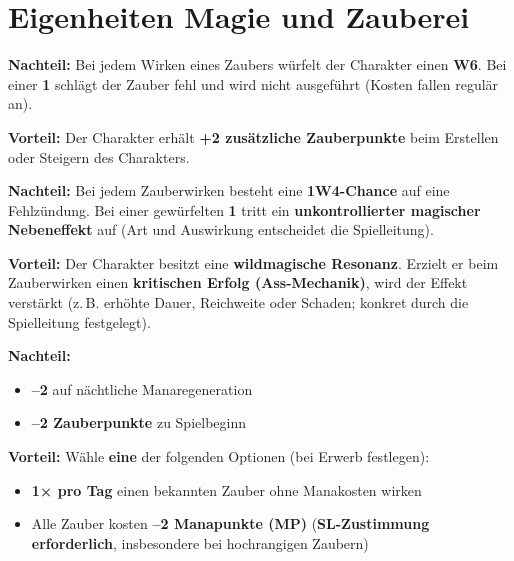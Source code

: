 \section{Eigenheiten Magie und Zauberei}

\begin{traitbox}{}
	
	\textbf{Nachteil:}  
	Bei jedem Wirken eines Zaubers würfelt der Charakter einen \textbf{W6}.
	Bei einer \textbf{1} schlägt der Zauber fehl und wird nicht ausgeführt
	(Kosten fallen regulär an).
	
	\medskip
	\textbf{Vorteil:}  
	Der Charakter erhält \textbf{+2 zusätzliche Zauberpunkte}
	beim Erstellen oder Steigern des Charakters.
	
\end{traitbox}

\begin{traitbox}{}
	
	\textbf{Nachteil:}  
	Bei jedem Zauberwirken besteht eine \textbf{1W4-Chance} auf eine Fehlzündung.
	Bei einer gewürfelten \textbf{1} tritt ein \textbf{unkontrollierter magischer Nebeneffekt}
	auf (Art und Auswirkung entscheidet die Spielleitung).
	
	\medskip
	\textbf{Vorteil:}  
	Der Charakter besitzt eine \textbf{wildmagische Resonanz}.  
	Erzielt er beim Zauberwirken einen \textbf{kritischen Erfolg (Ass-Mechanik)},
	wird der Effekt verstärkt (z.\,B. erhöhte Dauer, Reichweite oder Schaden;
	konkret durch die Spielleitung festgelegt).
	
\end{traitbox}

\begin{traitbox}{}
	
	\textbf{Nachteil:}  
	\begin{itemize}
		\item \textbf{–2} auf nächtliche Manaregeneration
		\item \textbf{–2 Zauberpunkte} zu Spielbeginn
	\end{itemize}
	
	\medskip
	\textbf{Vorteil:}  
	Wähle \textbf{eine} der folgenden Optionen (bei Erwerb festlegen):
	\begin{itemize}
		\item \textbf{1× pro Tag} einen bekannten Zauber ohne Manakosten wirken
		\item Alle Zauber kosten \textbf{–2 Manapunkte (MP)}
		(\textbf{SL-Zustimmung erforderlich}, insbesondere bei hochrangigen Zaubern)
	\end{itemize}
	
\end{traitbox}

